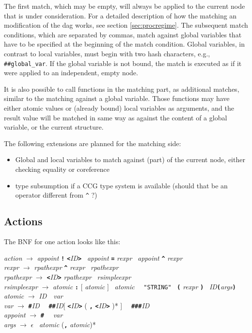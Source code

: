 \documentclass[11pt,a4paper]{article}
\newcommand{\cd}[1]{\texttt{#1}}
\begin{document}
The first match, which may be empty, will always be applied to the current node
that is under consideration. For a detailed description of how the matching an
modification of the dag works, see section \ref{sec:procregime}. The subsequent
match conditions, which are separated by commas, match against global variables
that have to be specified at the beginning of the match condition. Global
variables, in contrast to local variables, must begin with two hash characters,
e.g., \texttt{\#\#global\_var}. If the global variable is not bound, the match
is executed as if it were applied to an independent, empty node.

It is also possible to call functions in the matching part, as additional
matches, similar to the matching against a global variable. Those functions
may have either atomic values or (already bound) local variables as arguments,
and the result value will be matched in same way as against the content of
a global variable, or the current structure.

The following extensions are planned for the matching side:
\begin{itemize}
\item Global and local variables to match against (part) of the current node,
  either checking equality or coreference
\item type subsumption if a CCG type system is available (should that be an
  operator different from \cd{\^} ?)
\end{itemize}

\subsection{Actions}

The BNF for one action looks like this:
{
\newcommand{\nt}[1]{\emph{#1}}
\newcommand{\tok}[1]{\texttt{\textbf{#1}}}
\newcommand{\id}{\mbox{\textit{\textsf{ID}}}}
\begin{flushleft}
\nt{action} $\rightarrow$ \nt{appoint} \tok{!} \tok{<}\id \tok{>} \textbar\
\nt{appoint} \tok{=} \nt{rexpr} \textbar\  \nt{appoint} \tok{\^{}} \nt{rexpr}\\
\nt{rexpr} $\rightarrow$
  \nt{rpathexpr} \tok{\^{}} \nt{rexpr} \textbar\
  \nt{rpathexpr}\\
\nt{rpathexpr} $\rightarrow$
  \tok{<}\id \tok{>} \nt{rpathexpr} \textbar\
  \nt{rsimpleexpr}\\
\nt{rsimpleexpr} $\rightarrow$
  \nt{atomic} \tok{:} [ \nt{atomic} ] \textbar\
  \nt{atomic} \textbar\ \ \verb$"STRING"$  \textbar\
  \tok{(} \nt{rexpr} \tok{)} \textbar\
  \id\tok{(}\nt{args}\tok{)}\\
\nt{atomic} $\rightarrow$ \id \ \textbar\ \nt{var}\\
\nt{var} $\rightarrow$
  \tok{\#}\id \ \textbar
  \ \tok{\#\#}\id [ \tok{<}\id \tok{>} ( \tok{,} \tok{<}\id \tok{>} )* ] \textbar\
  \ \tok{\#\#\#}\id \\
\nt{appoint} $\rightarrow$ \tok{\#}  \ \textbar\ \nt{var}\\
\nt{args} $\rightarrow$ $\epsilon$
  \textbar\ \nt{atomic} (\tok{,} \nt{atomic})*
\end{flushleft}
}
\end{document}
